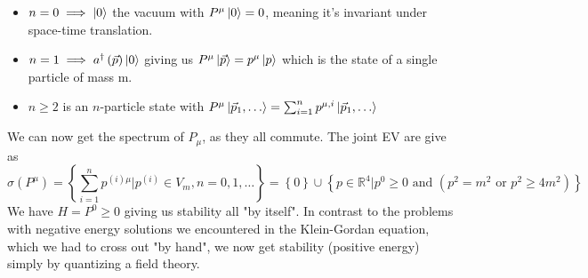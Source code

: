 \documentclass{report}
\begin{document}
\begin{itemize}
  \item $n = 0 \implies \ket{0} $ the vacuum with $P^{\mu} \ket{0} = 0$, meaning it's invariant under space-time translation.
  \item $n = 1 \implies a^\dagger\left( \vec{p} \right) \ket{0} $ giving us $P^{\mu} \ket{\vec{p}} = p^{\mu} \ket{p} $ which is the state of a single particle of mass m.
  \item $n \ge 2$ is an $n$-particle state with $P^{\mu} \ket{\vec{p}_1,\ldots}  = \sum_{i=1}^{n} p^{\mu,i} \ket{\vec{p}_1,\ldots}    $
\end{itemize}
We can now get the spectrum of $P_\mu$, as they all commute. The joint EV are give as \[
\sigma\left( P^{\mu}  \right) = \left\{ \sum_{i=1}^{n} p^{\left( i \right) \mu} | p^{\left( i \right)} \in V_m, n = 0,1,\ldots   \right\} 
= \left\{ 0 \right\} \cup \left\{ p\in \mathbb{R}^{4} | p^{0} \ge 0 \text{ and } \left( p^2 = m^2 \text{ or } p^2 \ge 4m^2 \right)  \right\} 
\] 
We have $H = P^{0} \ge 0$ giving us stability all "by itself". In contrast to the problems with negative energy solutions we encountered in the Klein-Gordan equation, which we had to cross out "by hand", we now get stability (positive energy) simply by quantizing a field theory. \\
\end{document}

